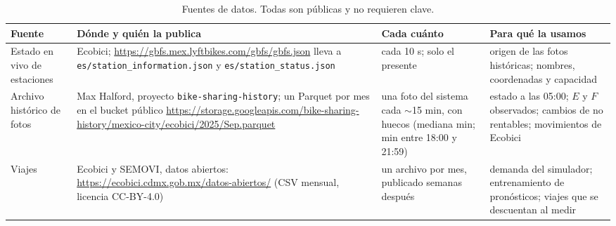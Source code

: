 \documentclass[conference,letterpaper,10pt]{IEEEtran}
\begin{document}
\begin{table}[t]
\centering\footnotesize
\caption{Fuentes de datos. Todas son públicas y no requieren clave.}
\label{tab:fuentes}
\begin{tabularx}{\textwidth}{@{}p{2.6cm}Yp{2.3cm}Y@{}}
\toprule
Fuente & Dónde y quién la publica & Cada cuánto & Para qué la usamos \\
\midrule
Estado en vivo de estaciones & Ecobici; \url{https://gbfs.mex.lyftbikes.com/gbfs/gbfs.json} lleva a \texttt{es/station\_information.json} y \texttt{es/station\_status.json} & cada 10 s; solo el presente & origen de las fotos históricas; nombres, coordenadas y capacidad \\
Archivo histórico de fotos & Max Halford, proyecto \texttt{bike-sharing-history}; un Parquet por mes en el bucket público \url{https://storage.googleapis.com/bike-sharing-history/mexico-city/ecobici/2025/Sep.parquet} & una foto del sistema cada $\sim$15 min, con huecos (mediana \rhuecoMed{} min; \rhuecoTarde{} min entre 18:00 y 21:59) & estado a las 05:00; $E$ y $F$ observados; cambios de no rentables; movimientos de Ecobici \\
Viajes & Ecobici y SEMOVI, datos abiertos: \url{https://ecobici.cdmx.gob.mx/datos-abiertos/} (CSV mensual, licencia CC-BY-4.0) & un archivo por mes, publicado semanas después & demanda del simulador; entrenamiento de pronósticos; viajes que se descuentan al medir \\
\bottomrule
\end{tabularx}
\end{table}
\end{document}
